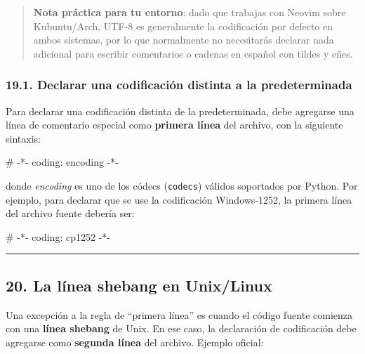 \documentclass[
  doc,
  floatsintext,
  longtable,
  a4paper,
  nolmodern,
  notxfonts,
  notimes,
  12pt,
  colorlinks=true,linkcolor=blue,citecolor=blue,urlcolor=blue]{apa7}
\newenvironment{Shaded}{\begin{snugshade}}{\end{snugshade}}
\newcommand{\CommentTok}[1]{\textcolor[rgb]{0.37,0.37,0.37}{#1}}
\begin{document}
\begin{quote}
\textbf{Nota práctica para tu entorno}: dado que trabajas con Neovim
sobre Kubuntu/Arch, UTF-8 es generalmente la codificación por defecto en
ambos sistemas, por lo que normalmente no necesitarás declarar nada
adicional para escribir comentarios o cadenas en español con tildes y
eñes.
\end{quote}

\subsubsection{19.1. Declarar una codificación distinta a la
predeterminada}\label{declarar-una-codificaciuxf3n-distinta-a-la-predeterminada}

Para declarar una codificación distinta de la predeterminada, debe
agregarse una línea de comentario especial como \textbf{primera línea}
del archivo, con la siguiente sintaxis:

\begin{Shaded}
\begin{Highlighting}[]
\CommentTok{\# {-}*{-} coding: encoding {-}*{-}}
\end{Highlighting}
\end{Shaded}

donde \emph{encoding} es uno de los códecs (\texttt{codecs}) válidos
soportados por Python. Por ejemplo, para declarar que se use la
codificación Windows-1252, la primera línea del archivo fuente debería
ser:

\begin{Shaded}
\begin{Highlighting}[]
\CommentTok{\# {-}*{-} coding: cp1252 {-}*{-}}
\end{Highlighting}
\end{Shaded}

\begin{center}\rule{0.5\linewidth}{0.5pt}\end{center}

\subsection{20. La línea shebang en
Unix/Linux}\label{la-luxednea-shebang-en-unixlinux}

Una excepción a la regla de ``primera línea'' es cuando el código fuente
comienza con una \textbf{línea shebang} de Unix. En ese caso, la
declaración de codificación debe agregarse como \textbf{segunda línea}
del archivo. Ejemplo oficial:
\end{document}
